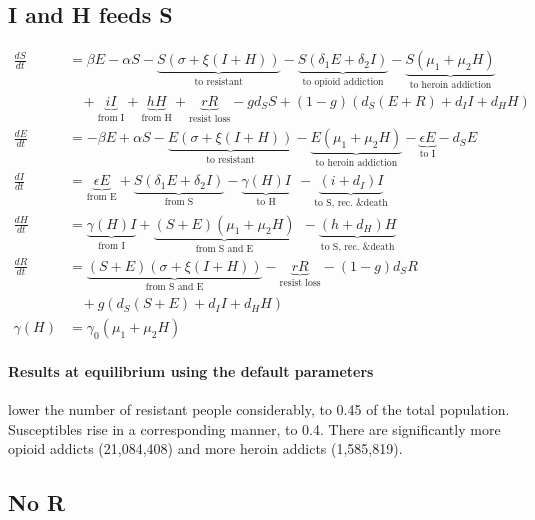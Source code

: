 \documentclass[11pt]{report}
\begin{document}
\subsection*{I and H feeds S}

\begin{align*}
\frac{dS}{dt} &= \beta E - \alpha S - \underbrace{S(\sigma + \xi(I+H))}_{\text{to resistant}} - \underbrace{S(\delta_1 E + \delta_2 I)}_{\text{to opioid addiction}} - \underbrace{S(\mu_1+\mu_2H)}_{\text{to heroin addiction}}\\
&\ \ \ \ + \underbrace{iI}_{\text{from I}} + \underbrace{hH}_{\text{from H}} 
+ \underbrace{rR}_{\text{resist loss}} - gd_SS + (1-g)(d_S(E+R) + d_II + d_HH)\\
\frac{dE}{dt} &= - \beta E + \alpha S - \underbrace{E(\sigma + \xi(I+H))}_{\text{to resistant}} - \underbrace{E(\mu_1 + \mu_2H)}_{\text{to heroin addiction}} - \underbrace{\epsilon E}_{\text{to I}} - d_S E\\
\frac{dI}{dt} &= \underbrace{\epsilon E}_{\text{from E}} + \underbrace{S(\delta_1E+\delta_2I)}_{\text{from S}} - \underbrace{\gamma(H)I}_{\text{to H}}\ \ 
- \underbrace{(i+d_I)I}_{\text{to S, rec. \& death}}\\
\frac{dH}{dt} &= \underbrace{\gamma(H)I}_{\text{from I}} + \underbrace{(S+E)(\mu_1+\mu_2H)}_{\text{from S and E}}\ \ - \underbrace{(h+d_H)H}_{\text{to S, rec. \& death}}\\
\frac{dR}{dt} &= \underbrace{(S+E)(\sigma + \xi(I+H))}_{\text{from S and E}} -
\underbrace{rR}_{\text{resist loss}} - (1-g)d_SR\\ 
&\ \ \ \ + g(d_S(S+E) + d_II + d_HH)\\
\gamma(H) &= \gamma_0(\mu_1+\mu_2H)
\end{align*}

\paragraph{Results at equilibrium using the default parameters} lower the number of resistant people considerably, to 0.45 of the total population. Susceptibles rise in a corresponding manner, to 0.4. There are significantly more opioid addicts (21,084,408) and more heroin addicts (1,585,819). 

\subsection*{No R}
\end{document}

